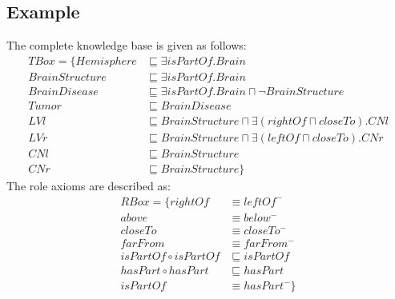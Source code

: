 \documentclass{article}
\begin{document}
% 



\subsection{Example}
 The complete knowledge base is given as follows:
\begin{align*}
 TBox=\{ Hemisphere &\sqsubseteq \exists isPartOf. Brain\\
	 BrainStructure &\sqsubseteq \exists isPartOf. Brain\\
	 BrainDisease &\sqsubseteq \exists isPartOf. Brain \sqcap \neg BrainStructure\\
	 Tumor  &\sqsubseteq BrainDisease\\
	 LVl &\sqsubseteq BrainStructure \sqcap \exists (rightOf \sqcap closeTo). CNl\\
	 LVr &\sqsubseteq BrainStructure \sqcap \exists (leftOf \sqcap closeTo). CNr\\
	 CNl &\sqsubseteq BrainStructure\\
	 CNr &\sqsubseteq BrainStructure\}
\end{align*}
The role axioms are described as:
\begin{align*}
 RBox=\{ rightOf &\equiv leftOf^-\\
         above &\equiv below^- \\
	 closeTo &\equiv closeTo^- \\
	 farFrom &\equiv farFrom^- \\
	 isPartOf \circ isPartOf &\sqsubseteq isPartOf \\
	 hasPart \circ hasPart &\sqsubseteq hasPart\\
	 isPartOf &\equiv hasPart^-\}
\end{align*}
\end{document}
